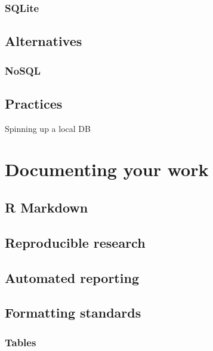 \documentclass[
]{book}
\begin{document}
\hypertarget{sqlite}{%
\section{SQLite}\label{sqlite}}

\hypertarget{alternatives}{%
\chapter{Alternatives}\label{alternatives}}

\hypertarget{nosql}{%
\section{NoSQL}\label{nosql}}

\hypertarget{practices}{%
\chapter{Practices}\label{practices}}

Spinning up a local DB

\hypertarget{part-documenting-your-work}{%
\part{Documenting your work}\label{part-documenting-your-work}}

\hypertarget{r-markdown}{%
\chapter{R Markdown}\label{r-markdown}}

\hypertarget{reproducible-research}{%
\chapter{Reproducible research}\label{reproducible-research}}

\hypertarget{automated-reporting}{%
\chapter{Automated reporting}\label{automated-reporting}}

\hypertarget{formatting-standards}{%
\chapter{Formatting standards}\label{formatting-standards}}

\hypertarget{tables-1}{%
\section{Tables}\label{tables-1}}
\end{document}
